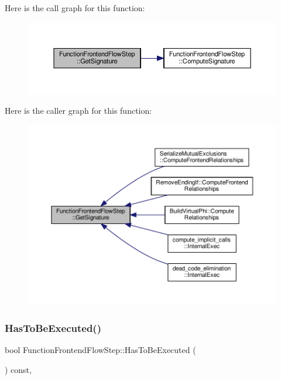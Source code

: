 Here is the call graph for this function\+:
\nopagebreak
\begin{figure}[H]
\begin{center}
\leavevmode
\includegraphics[width=350pt]{d8/d0a/classFunctionFrontendFlowStep_a89e3f6d142de8aacb36eeb7b3f3d5ad8_cgraph}
\end{center}
\end{figure}
Here is the caller graph for this function\+:
\nopagebreak
\begin{figure}[H]
\begin{center}
\leavevmode
\includegraphics[width=350pt]{d8/d0a/classFunctionFrontendFlowStep_a89e3f6d142de8aacb36eeb7b3f3d5ad8_icgraph}
\end{center}
\end{figure}
\mbox{\label{classFunctionFrontendFlowStep_a12e786363530aa9533e4bd9380130d75}} 
\subsubsection{\texorpdfstring{Has\+To\+Be\+Executed()}{HasToBeExecuted()}}
{\footnotesize\ttfamily bool Function\+Frontend\+Flow\+Step\+::\+Has\+To\+Be\+Executed (\begin{DoxyParamCaption}{ }\end{DoxyParamCaption}) const\hspace{0.3cm}{\ttfamily [override]}, {\ttfamily [virtual]}}



